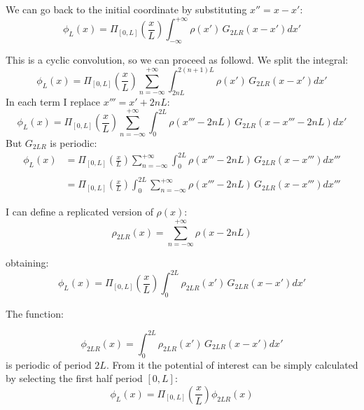 \documentclass[a4paper,12pt]{report}
\begin{document}
We can go back to the initial coordinate by substituting $x'' = x-x'$:
\begin{equation}
\phi_L(x) = 
\Pi_{[0,L]}\left(\frac{x}{L}\right)
\int_{-\infty}^{+\infty} 
\rho(x')\,G_{2LR}(x-x') dx'
\end{equation}

This is a cyclic convolution, so we can proceed as followd. We split the integral:
\begin{equation}
\phi_L(x) = 
\Pi_{[0,L]}\left(\frac{x}{L}\right)
\sum_{n=-\infty}^{+\infty}
\int_{2nL}^{2(n+1)L} 
\rho(x')\,G_{2LR}(x-x') dx'
\label{eq:conv3}
\end{equation}
In each term I replace $x''' = x'+2nL$:
\begin{equation}
\phi_L(x) = 
\Pi_{[0,L]}\left(\frac{x}{L}\right)
\sum_{n=-\infty}^{+\infty}
\int_{0 }^{2L} 
\rho(x'''-2nL)\,G_{2LR}(x-x'''-2nL) dx'
\label{eq:conv4}
\end{equation}
But $G_{2LR}$ is periodic:
\begin{equation}
\begin{split}
\phi_L(x) &= 
\Pi_{[0,L]}\left(\frac{x}{L}\right)
\sum_{n=-\infty}^{+\infty}
\int_{0 }^{2L} 
\rho(x'''-2nL)\,G_{2LR}(x-x''') dx'''\\
\\&=
\Pi_{[0,L]}\left(\frac{x}{L}\right)
\int_{0 }^{2L}  
\sum_{n=-\infty}^{+\infty}
\rho(x'''-2nL)\,G_{2LR}(x-x''') dx'''
\end{split}
\label{eq:conv5}
\end{equation}

I can define a replicated version of $\rho(x)$:
\begin{equation}
\rho_{2LR}(x)= \sum_{n=-\infty}^{+\infty}
\rho(x-2nL)
\end{equation}

obtaining:
\begin{equation}
\phi_L(x) = 
\Pi_{[0,L]}\left(\frac{x}{L}\right)
\int_{0 }^{2L} 
\rho_{2LR}(x')\,G_{2LR}(x-x') dx'
\label{eq:conv6}
\end{equation}

The function:

\begin{equation}
\phi_{2LR}(x) = 
\int_{0 }^{2L} 
\rho_{2LR}(x')\,G_{2LR}(x-x') dx'
\label{eq:confin}
\end{equation}
is periodic of period $2L$. From it the potential of interest can be simply calculated by selecting the first half period $[0, L]$:
\begin{equation}
\phi_L(x) = 
\Pi_{[0,L]}\left(\frac{x}{L}\right)
\phi_{2LR}(x)
\label{eq:sel}
\end{equation}
\end{document}
